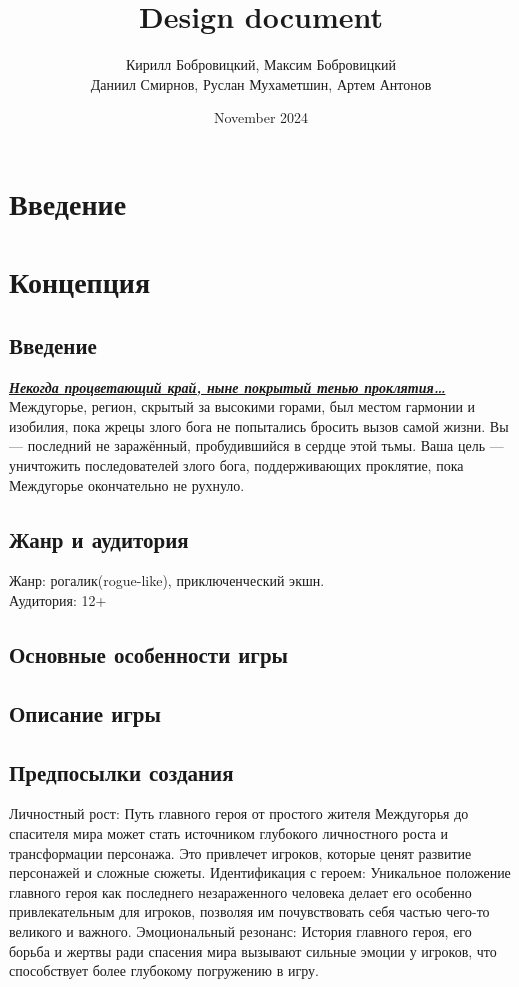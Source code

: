 \documentclass{article}
\title{Design document}
\author{Кирилл Бобровицкий, Максим Бобровицкий\\
Даниил Смирнов, Руслан Мухаметшин, Артем Антонов}
\date{November 2024}
\begin{document}
\maketitle

\tableofcontents
\newpage

\section{Введение}


\newpage

\section{Концепция}
\subsection{Введение}
\noindent\textit{\textbf{\underline{Некогда процветающий край, ныне покрытый тенью проклятия…}}}
Междугорье, регион, скрытый за высокими горами, был местом гармонии и изобилия, пока жрецы злого бога не попытались бросить вызов самой жизни.  
Вы — последний не заражённый, пробудившийся в сердце этой тьмы. Ваша цель — уничтожить последователей злого бога, поддерживающих проклятие, пока Междугорье окончательно не рухнуло.

\subsection{Жанр и аудитория}
Жанр: рогалик(rogue-like), приключенческий экшн.\\  
Аудитория: 12+

\subsection{Основные особенности игры}

\subsection{Описание игры}


\subsection{Предпосылки создания}
Личностный рост: Путь главного героя от простого жителя Междугорья до спасителя мира может стать источником глубокого личностного роста и трансформации персонажа. Это привлечет игроков, которые ценят развитие персонажей и сложные сюжеты.
Идентификация с героем: Уникальное положение главного героя как последнего незараженного человека делает его особенно привлекательным для игроков, позволяя им почувствовать себя частью чего-то великого и важного.
Эмоциональный резонанс: История главного героя, его борьба и жертвы ради спасения мира вызывают сильные эмоции у игроков, что способствует более глубокому погружению в игру.
\end{document}

